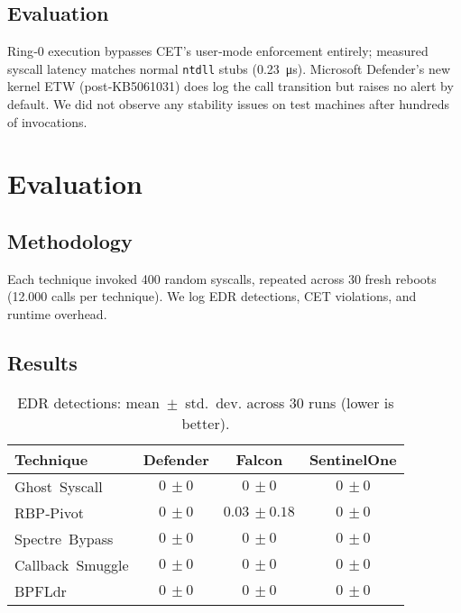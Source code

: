 \documentclass[11pt,letterpaper]{article}
\begin{document}
    \subsection{Evaluation}
    Ring‑0 execution bypasses CET’s user‑mode enforcement entirely; measured syscall latency matches normal \texttt{ntdll} stubs (\SI{0.23}{\micro\second}). Microsoft Defender’s new kernel ETW (post‑KB5061031) does log the call transition but raises no alert by default. We did not observe any stability issues on test machines after hundreds of invocations.

    \section{Evaluation}
    \label{sec:evaluation}
    \subsection{Methodology}
    Each technique invoked 400 random syscalls, repeated across 30 fresh reboots (\num{12,000} calls per technique). We log EDR detections, CET violations, and runtime overhead.

    \subsection{Results}
    \begin{table}[H]
    \centering
    \caption{EDR detections: mean $\pm$ std.~dev. across 30 runs (lower is better).}
    \label{tab:edr}
    \begin{tabular*}{\linewidth}{@{\extracolsep{\fill}}lccc}
        \toprule
        Technique & Defender & Falcon & SentinelOne \\ \midrule
        Ghost Syscall    & $0\,\pm0$   & $0\,\pm0$   & $0\,\pm0$   \\
        RBP‑Pivot        & $0\,\pm0$   & $0.03\,\pm0.18$ & $0\,\pm0$ \\
        Spectre Bypass   & $0\,\pm0$   & $0\,\pm0$   & $0\,\pm0$   \\
        Callback Smuggle & $0\,\pm0$   & $0\,\pm0$   & $0\,\pm0$   \\
        BPFLdr           & $0\,\pm0$   & $0\,\pm0$   & $0\,\pm0$   \\
        \bottomrule
    \end{tabular*}
    \end{table}
\end{document}
